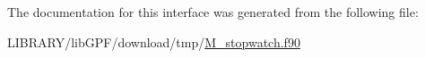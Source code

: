 The documentation for this interface was generated from the following file\+:\begin{DoxyCompactItemize}
\item 
L\+I\+B\+R\+A\+R\+Y/lib\+G\+P\+F/download/tmp/\hyperlink{M__stopwatch_8f90}{M\+\_\+stopwatch.\+f90}\end{DoxyCompactItemize}
